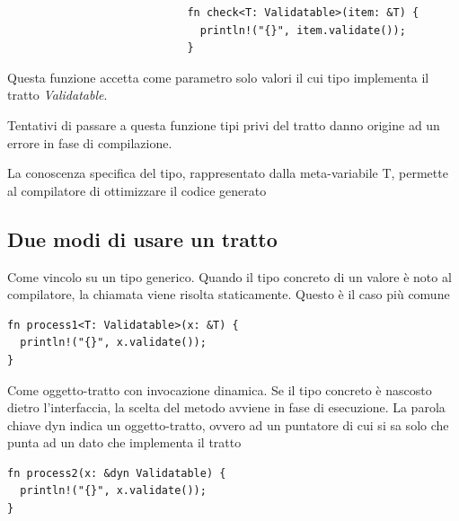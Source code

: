 \begin{center}
  \begin{verbatim}
                            fn check<T: Validatable>(item: &T) {
                              println!("{}", item.validate());
                            }
\end{verbatim}
\end{center}

Questa funzione accetta come parametro solo valori il cui tipo implementa il
tratto \textit{Validatable}.

Tentativi di passare a questa funzione tipi privi del tratto danno origine ad un
errore in fase di compilazione.

La conoscenza specifica del tipo, rappresentato dalla meta-variabile T, permette
al compilatore di ottimizzare il codice generato


\subsection{Due modi di usare un tratto}

\begin{center}
  \begin{minipage}[t]{0.47\linewidth}
    Come vincolo su un tipo generico. Quando il tipo concreto di un valore è noto
    al compilatore, la chiamata viene risolta staticamente. Questo è il caso più
    comune

    \begin{verbatim}    
fn process1<T: Validatable>(x: &T) {
  println!("{}", x.validate());
}
    \end{verbatim}

  \end{minipage}
  \hfill
  \begin{minipage}[t]{0.47\linewidth}
    Come oggetto-tratto con invocazione dinamica.
    Se il tipo concreto è nascosto dietro l'interfaccia, la scelta del
    metodo avviene in fase di esecuzione. La parola chiave dyn indica un
    oggetto-tratto, ovvero ad un puntatore di cui si sa solo che punta ad un
    dato che implementa il tratto

    \begin{verbatim}
fn process2(x: &dyn Validatable) {
  println!("{}", x.validate());
}
    \end{verbatim}

  \end{minipage}
\end{center}

